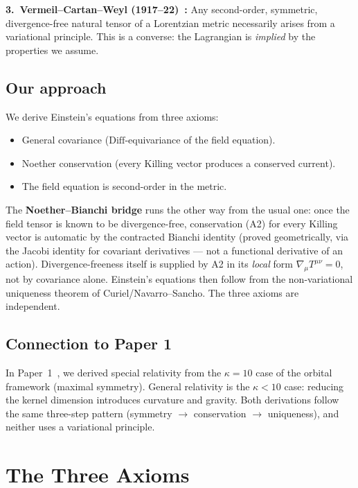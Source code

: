 \documentclass[12pt]{article}
\theoremstyle{plain}
\theoremstyle{definition}
\theoremstyle{remark}
\newcommand{\Diff}{\mathrm{Diff}}
\begin{document}
\textbf{3.\ Vermeil--Cartan--Weyl (1917--22)~\cite{vermeil1917,cartan1922,weyl1922}:} Any second-order, symmetric, divergence-free natural tensor of a Lorentzian metric necessarily arises from a variational principle. This is a converse: the Lagrangian is \emph{implied} by the properties we assume.

\subsection{Our approach}

We derive Einstein's equations from three axioms:
\begin{itemize}
    \item[(A1)] General covariance ($\Diff$-equivariance of the field equation).
    \item[(A2)] Noether conservation (every Killing vector produces a conserved current).
    \item[(A3)] The field equation is second-order in the metric.
\end{itemize}

The \textbf{Noether--Bianchi bridge} runs the other way from the usual one: once the field tensor is known to be divergence-free, conservation (A2) for every Killing vector is automatic by the contracted Bianchi identity (proved geometrically, via the Jacobi identity for covariant derivatives --- not a functional derivative of an action). Divergence-freeness itself is supplied by A2 in its \emph{local} form $\nabla_\mu T^{\mu\nu}=0$, not by covariance alone. Einstein's equations then follow from the non-variational uniqueness theorem of Curiel/Navarro--Sancho. The three axioms are independent.

\subsection{Connection to Paper 1}

In Paper~1~\cite{nembe2026p1}, we derived special relativity from the $\kappa = 10$ case of the orbital framework (maximal symmetry). General relativity is the $\kappa < 10$ case: reducing the kernel dimension introduces curvature and gravity. Both derivations follow the same three-step pattern (symmetry $\to$ conservation $\to$ uniqueness), and neither uses a variational principle.


\section{The Three Axioms}
\label{sec:axioms}
\end{document}

